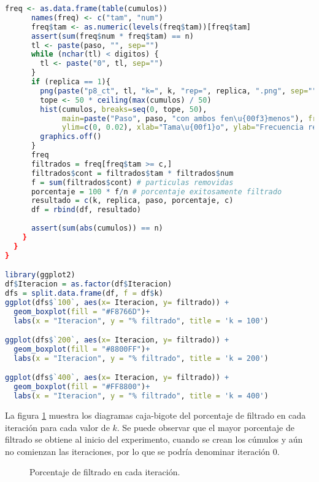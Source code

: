 \documentclass{article}
\begin{document}
\begin{lstlisting}[language=R, caption= Código para graficar el porcentaje de filtrado en cada iteración.]
      freq <- as.data.frame(table(cumulos))
      names(freq) <- c("tam", "num")
      freq$tam <- as.numeric(levels(freq$tam))[freq$tam]
      assert(sum(freq$num * freq$tam) == n)
      tl <- paste(paso, "", sep="")
      while (nchar(tl) < digitos) {
        tl <- paste("0", tl, sep="")
      }
      if (replica == 1){
        png(paste("p8_ct", tl, "k=", k, "rep=", replica, ".png", sep=""), width=300, height=300)
        tope <- 50 * ceiling(max(cumulos) / 50)
        hist(cumulos, breaks=seq(0, tope, 50), 
             main=paste("Paso", paso, "con ambos fen\u{00f3}menos"), freq=FALSE,
             ylim=c(0, 0.02), xlab="Tama\u{00f1}o", ylab="Frecuencia relativa")
        graphics.off() 
      }
      freq
      filtrados = freq[freq$tam >= c,]
      filtrados$cont = filtrados$tam * filtrados$num
      f = sum(filtrados$cont) # particulas removidas
      porcentaje = 100 * f/n # porcentaje exitosamente filtrado
      resultado = c(k, replica, paso, porcentaje, c)
      df = rbind(df, resultado)
  
      assert(sum(abs(cumulos)) == n)
    }  
  }
}

library(ggplot2)
df$Iteracion = as.factor(df$Iteracion)
dfs = split.data.frame(df, f = df$k)
ggplot(dfs$`100`, aes(x= Iteracion, y= filtrado)) + 
  geom_boxplot(fill = "#F8766D")+
  labs(x = "Iteracion", y = "% filtrado", title = 'k = 100')

ggplot(dfs$`200`, aes(x= Iteracion, y= filtrado)) + 
  geom_boxplot(fill = "#8800FF")+
  labs(x = "Iteracion", y = "% filtrado", title = 'k = 200')

ggplot(dfs$`400`, aes(x= Iteracion, y= filtrado)) + 
  geom_boxplot(fill = "#FF8800")+
  labs(x = "Iteracion", y = "% filtrado", title = 'k = 400')
\end{lstlisting}

\newpage

La figura \ref{f1} muestra los diagramas caja-bigote del porcentaje de filtrado en cada iteración para cada valor de $k$. Se puede observar que el mayor porcentaje de filtrado se obtiene al inicio del experimento, cuando se crean los cúmulos y aún no comienzan las iteraciones, por lo que se podría denominar iteración $0$.

\begin{figure}[h!]
\centering
{}
\caption{Porcentaje de filtrado en cada iteración.} 
\label{f1}
\end{figure}
\end{document}
